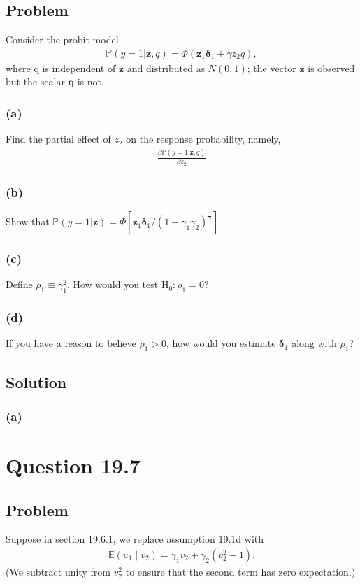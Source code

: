 \documentclass[10pt, a4paper]{article}
\newcommand{\PP}{\mathbb P}
\newcommand{\EE}{\mathbb E}
\begin{document}
  \subsection*{Problem}
    Consider the probit model
    \begin{gather*}
      \PP(y=1|\textbf{z},q) = \Phi(\textbf{z}_1\boldsymbol{\delta}_1+\gamma z_2q),
    \end{gather*}
    where q is independent of $\textbf{z}$ and distributed as $N(0,1)$; the vector $\textbf{z}$ is observed but the scalar $\textbf{q}$ is not.
    \subsubsection*{(a)}
      Find the partial effect of $z_2$ on the response probability, namely,
      \begin{gather*}
        \frac{\partial\PP(y=1|\textbf{z},q)}{\partial z_2}
      \end{gather*}
    \subsubsection*{(b)}
      Show that $\PP(y=1|\textbf{z}) = \Phi[\textbf{z}_1{\boldsymbol\delta}_1/(1+\gamma_1\gamma_2)^{\frac{1}{2}}]$
    \subsubsection*{(c)}
      Define $\rho_1 \equiv \gamma_1^2$. How would you test $\text{H}_0: \rho_1=0$?
    \subsubsection*{(d)}
      If you have a reason to believe $\rho_1>0$, how would you estimate $\boldsymbol{\delta}_1$ along with $\rho_1$?
  \subsection*{Solution}
    \subsubsection*{(a)}
      
\section*{Question 19.7}
  \subsection*{Problem}
    Suppose in section 19.6.1, we replace assumption 19.1d with
    \begin{gather*}
      \EE(u_1 \mid v_2)=\gamma_1 v_2+\gamma_2(v_2^2-1) .
    \end{gather*}
    (We subtract unity from $v_2^2$ to ensure that the second term has zero expectation.)
\end{document}
